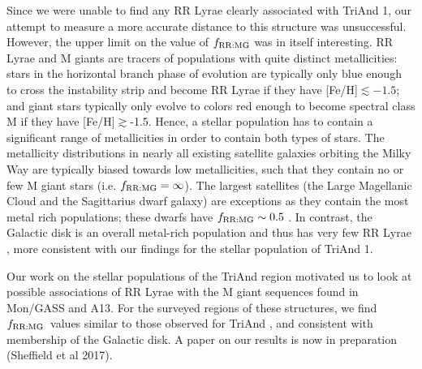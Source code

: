 \documentclass[galaxies,article,submit,moreauthors,pdftex,10pt,a4paper]{mdpi}
\newcommand{\frrmg}{\ensuremath{f_{\rm RR:MG}}}
\begin{document}

Since we were unable to find any RR Lyrae clearly associated with TriAnd 1, our attempt to measure a more accurate distance to this structure was unsuccessful.
However, the upper limit on the value of $\frrmg$ was in itself interesting.
RR Lyrae and M giants are tracers of populations with quite distinct metallicities: stars in the horizontal branch phase of evolution are typically only blue enough to cross the instability strip and become RR Lyrae if they have [Fe/H]$\lesssim -1.5$; and giant stars typically only evolve to colors red enough to become spectral class M if they have [Fe/H]$\gtrsim$-1.5.
Hence, a stellar population has to contain a significant range of metallicities in order to contain both types of stars.
The metallicity distributions in nearly all existing satellite galaxies
orbiting the Milky Way \cite[e.g.,][]{kirby11} are typically biased towards
low metallicities, such that they contain no or few M giant stars (i.e. $\frrmg = \infty$).
The largest satellites (the Large Magellanic Cloud and the Sagittarius dwarf galaxy) are exceptions as they contain the most metal rich populations; these dwarfs have $\frrmg \sim 0.5$ \cite{pricewhelan15}.
In contrast, the Galactic disk is an overall metal-rich population and thus has very few RR Lyrae \cite[i.e. $f_{\rm RR:M} \sim 0$][]{amrose01}, more consistent with our findings for the stellar population of TriAnd 1.

Our work on the stellar populations of the TriAnd region motivated us to look at possible associations of RR Lyrae with the M giant sequences found in Mon/GASS and A13.
For the surveyed regions of these structures, we find \frrmg\ values similar to those observed for TriAnd , and consistent with membership of the Galactic disk. A paper on our results is now in preparation (Sheffield et al 2017).
\end{document}
